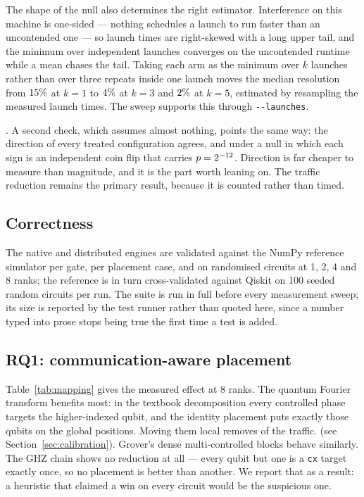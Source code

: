 \documentclass[11pt]{article}
\begin{document}
The shape of the null also determines the right estimator. Interference on
this machine is one-sided --- nothing schedules a launch to run faster than an
uncontended one --- so launch times are right-skewed with a long upper tail,
and the minimum over independent launches converges on the uncontended
runtime while a mean chases the tail. Taking each arm as the minimum over $k$
launches rather than over three repeats inside one launch moves the median
resolution from $15\%$ at $k=1$ to $4\%$
at $k=3$ and $2\%$ at $k=5$, estimated by resampling the
measured launch times. The sweep supports this through
\texttt{-{}-launches}.

\aegisqWallVerdict. A second check, which assumes almost nothing, points the
same way: the direction of every treated configuration agrees, and under a
null in which each sign is an independent coin flip that carries
$p = 2^{-12}$. Direction is far cheaper to measure than
magnitude, and it is the part worth leaning on. The traffic reduction remains
the primary result, because it is counted rather than timed.

\subsection{Correctness}

The native and distributed engines are validated against the NumPy reference
simulator per gate, per placement case, and on randomised circuits at 1, 2, 4
and 8 ranks; the reference is in turn cross-validated against Qiskit on 100
seeded random circuits per run. The suite is run in full before every
measurement sweep; its size is reported by the test runner rather than quoted
here, since a number typed into prose stops being true the first time a test
is added.

\subsection{RQ1: communication-aware placement}



Table~\ref{tab:mapping} gives the measured effect at 8 ranks.
The quantum Fourier transform benefits most: in the textbook decomposition
every controlled phase targets the higher-indexed qubit, and the identity
placement puts exactly those qubits on the global positions. Moving them local
removes \aegisqQftTraffic{} of the traffic. \aegisqQftWallClause{} (see
Section~\ref{sec:calibration}). Grover's dense
multi-controlled blocks behave similarly. The GHZ chain shows no reduction at
all --- every qubit but one is a \texttt{cx} target exactly once, so no
placement is better than another. We report that as a result: a heuristic that
claimed a win on every circuit would be the suspicious one.
\end{document}
